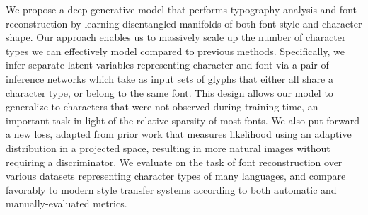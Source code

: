 We propose a deep generative model that performs typography analysis and font reconstruction by learning disentangled manifolds of both font style and character shape. Our approach enables us to massively scale up the number of character types we can effectively model compared to previous methods. Specifically, we infer separate latent variables representing character and font via a pair of inference networks which take as input sets of glyphs that either all share a character type, or belong to the same font. This design allows our model to generalize to characters that were not observed during training time, an important task in light of the relative sparsity of most fonts. We also put forward a new loss, adapted from prior work that measures likelihood using an adaptive distribution in a projected space, resulting in more natural images without requiring a discriminator. We evaluate on the task of font reconstruction over various datasets representing character types of many languages, and compare favorably to modern style transfer systems according to both automatic and manually-evaluated metrics.
